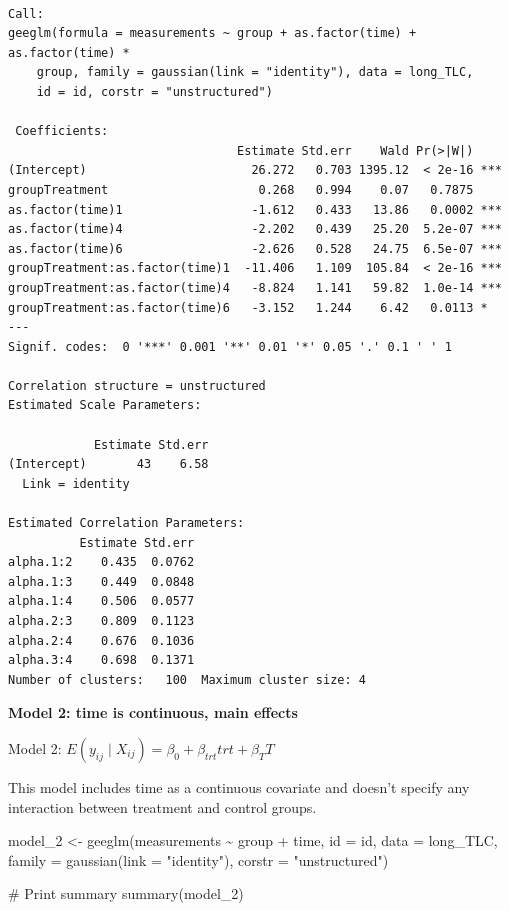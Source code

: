 \documentclass[
  letterpaper,
  DIV=11,
  numbers=noendperiod]{scrreprt}
\newenvironment{Shaded}{\begin{snugshade}}{\end{snugshade}}
\newcommand{\AttributeTok}[1]{\textcolor[rgb]{0.40,0.45,0.13}{#1}}
\newcommand{\CommentTok}[1]{\textcolor[rgb]{0.37,0.37,0.37}{#1}}
\newcommand{\FunctionTok}[1]{\textcolor[rgb]{0.28,0.35,0.67}{#1}}
\newcommand{\NormalTok}[1]{\textcolor[rgb]{0.00,0.23,0.31}{#1}}
\newcommand{\OtherTok}[1]{\textcolor[rgb]{0.00,0.23,0.31}{#1}}
\newcommand{\SpecialCharTok}[1]{\textcolor[rgb]{0.37,0.37,0.37}{#1}}
\newcommand{\StringTok}[1]{\textcolor[rgb]{0.13,0.47,0.30}{#1}}
\begin{document}
\begin{verbatim}

Call:
geeglm(formula = measurements ~ group + as.factor(time) + as.factor(time) * 
    group, family = gaussian(link = "identity"), data = long_TLC, 
    id = id, corstr = "unstructured")

 Coefficients:
                                Estimate Std.err    Wald Pr(>|W|)    
(Intercept)                       26.272   0.703 1395.12  < 2e-16 ***
groupTreatment                     0.268   0.994    0.07   0.7875    
as.factor(time)1                  -1.612   0.433   13.86   0.0002 ***
as.factor(time)4                  -2.202   0.439   25.20  5.2e-07 ***
as.factor(time)6                  -2.626   0.528   24.75  6.5e-07 ***
groupTreatment:as.factor(time)1  -11.406   1.109  105.84  < 2e-16 ***
groupTreatment:as.factor(time)4   -8.824   1.141   59.82  1.0e-14 ***
groupTreatment:as.factor(time)6   -3.152   1.244    6.42   0.0113 *  
---
Signif. codes:  0 '***' 0.001 '**' 0.01 '*' 0.05 '.' 0.1 ' ' 1

Correlation structure = unstructured 
Estimated Scale Parameters:

            Estimate Std.err
(Intercept)       43    6.58
  Link = identity 

Estimated Correlation Parameters:
          Estimate Std.err
alpha.1:2    0.435  0.0762
alpha.1:3    0.449  0.0848
alpha.1:4    0.506  0.0577
alpha.2:3    0.809  0.1123
alpha.2:4    0.676  0.1036
alpha.3:4    0.698  0.1371
Number of clusters:   100  Maximum cluster size: 4 
\end{verbatim}

\textbf{Model 2: time is continuous, main effects}

Model 2:
\(E(y_{ij} \mid X_{ij}) = \beta_0 + \beta_{trt}trt + \beta_{T}T\)

This model includes time as a continuous covariate and doesn't specify
any interaction between treatment and control groups.

\begin{Shaded}
\begin{Highlighting}[]
\NormalTok{model\_2 }\OtherTok{\textless{}{-}} \FunctionTok{geeglm}\NormalTok{(measurements }\SpecialCharTok{\textasciitilde{}}\NormalTok{ group }\SpecialCharTok{+}\NormalTok{ time, }\AttributeTok{id =}\NormalTok{ id, }\AttributeTok{data =}\NormalTok{ long\_TLC, }\AttributeTok{family =} \FunctionTok{gaussian}\NormalTok{(}\AttributeTok{link =} \StringTok{"identity"}\NormalTok{),}
    \AttributeTok{corstr =} \StringTok{"unstructured"}\NormalTok{)}

\CommentTok{\# Print summary}
\FunctionTok{summary}\NormalTok{(model\_2)}
\end{Highlighting}
\end{Shaded}
\end{document}
